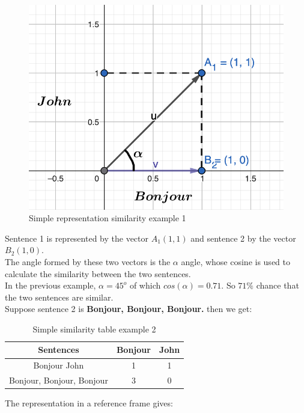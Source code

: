 \documentclass[a4paper, 14pt]{article}
\begin{document}
	 \begin{figure}[H]
		\includegraphics[scale=0.5, width=15cm]{./img/vecteur_exemple_simple.png}
		\caption{Simple representation similarity example 1}
	\end{figure}
	Sentence 1 is represented by the vector $A_{1}(1, 1)$ and sentence 2 by the vector $B_{2}(1, 0)$.\\
	The angle formed by these two vectors is the $\alpha$ angle, whose cosine is used to calculate the similarity between the two sentences.\\
	In the previous example, $\alpha=45^{o}$ of which $cos(\alpha)=0.71$. So $71\%$ chance that the two sentences are similar.\\
	Suppose sentence 2 is \textbf{Bonjour, Bonjour, Bonjour.} then we get:
	\begin{table}[H]
		\centering
		\begin{tabular}{|c|c|c|}
			\hline
			\textbf{Sentences} & \textbf{Bonjour} & \textbf{John} \\
			\hline
			Bonjour John & 1 & 1 \\
			Bonjour, Bonjour, Bonjour  & 3 & 0 \\
			\hline
		\end{tabular}
	\caption{Simple similarity table example 2}
	\label{tab:exemplesimple}
	\end{table}
	The representation in a reference frame gives:
\end{document}
